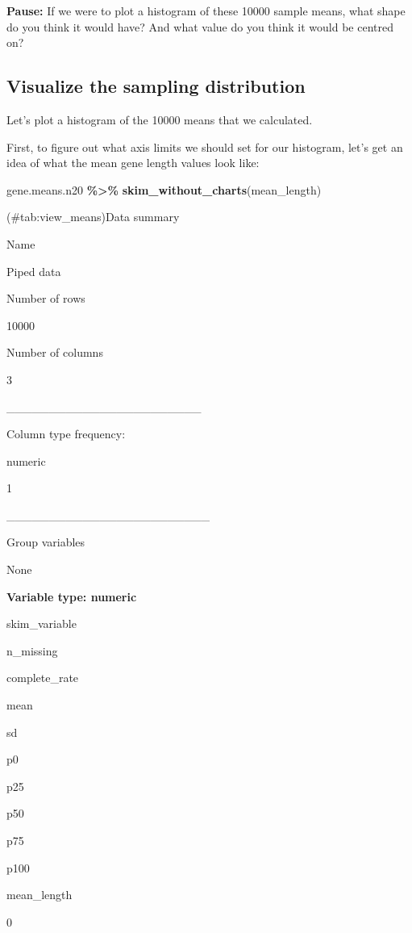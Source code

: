 \documentclass[
]{book}
\newenvironment{Shaded}{\begin{snugshade}}{\end{snugshade}}
\newcommand{\FunctionTok}[1]{\textcolor[rgb]{0.13,0.29,0.53}{\textbf{#1}}}
\newcommand{\NormalTok}[1]{#1}
\newcommand{\SpecialCharTok}[1]{\textcolor[rgb]{0.81,0.36,0.00}{\textbf{#1}}}
\begin{document}
\textbf{Pause:}
If we were to plot a histogram of these 10000 sample means, what shape do you think it would have? And what value do you think it would be centred on?

\subsection{Visualize the sampling distribution}\label{hist_samdist}

Let's plot a histogram of the 10000 means that we calculated.

First, to figure out what axis limits we should set for our histogram, let's get an idea of what the mean gene length values look like:

\begin{Shaded}
\begin{Highlighting}[]
\NormalTok{gene.means.n20 }\SpecialCharTok{\%\textgreater{}\%}
 \FunctionTok{skim\_without\_charts}\NormalTok{(mean\_length)}
\end{Highlighting}
\end{Shaded}

(\#tab:view\_means)Data summary

Name

Piped data

Number of rows

10000

Number of columns

3

\_\_\_\_\_\_\_\_\_\_\_\_\_\_\_\_\_\_\_\_\_\_\_

Column type frequency:

numeric

1

\_\_\_\_\_\_\_\_\_\_\_\_\_\_\_\_\_\_\_\_\_\_\_\_

Group variables

None

\textbf{Variable type: numeric}

skim\_variable

n\_missing

complete\_rate

mean

sd

p0

p25

p50

p75

p100

mean\_length

0
\end{document}
